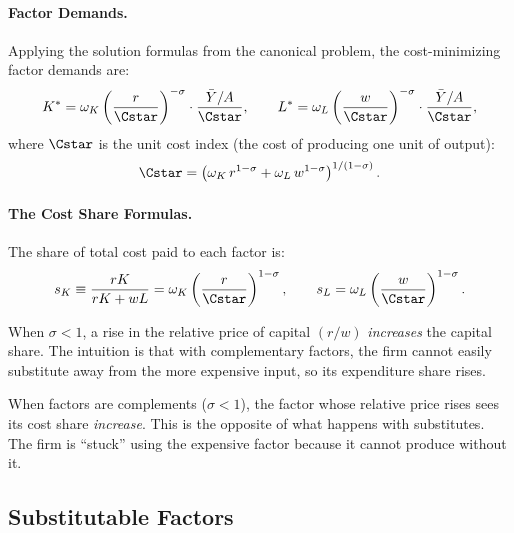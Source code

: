 \paragraph{Factor Demands.}
Applying the solution formulas from the canonical problem, the cost-minimizing factor demands are:
\begin{equation}
K^* = \omega_K \left( \frac{r}{\Cstar} \right)^{-\sigma} \cdot \frac{\bar{Y}/A}{\Cstar}, \qquad L^* = \omega_L \left( \frac{w}{\Cstar} \right)^{-\sigma} \cdot \frac{\bar{Y}/A}{\Cstar},
\label{eq:factor-demands}
\end{equation}
where $\Cstar$ is the unit cost index (the cost of producing one unit of output):
\begin{equation}
\Cstar = \left( \omega_K \, r^{1-\sigma} + \omega_L \, w^{1-\sigma} \right)^{1/(1-\sigma)}.
\label{eq:unit-cost}
\end{equation}

\paragraph{The Cost Share Formulas.}
The share of total cost paid to each factor is:
\begin{equation}
s_K \equiv \frac{rK}{rK + wL} = \omega_K \left( \frac{r}{\Cstar} \right)^{1-\sigma}, \qquad s_L = \omega_L \left( \frac{w}{\Cstar} \right)^{1-\sigma}.
\label{eq:cost-shares}
\end{equation}

When $\sigma < 1$, a rise in the relative price of capital $(r/w)$ \emph{increases} the capital share. The intuition is that with complementary factors, the firm cannot easily substitute away from the more expensive input, so its expenditure share rises.

\begin{calloutimportant}
When factors are complements ($\sigma < 1$), the factor whose relative price rises sees its cost share \emph{increase}. This is the opposite of what happens with substitutes. The firm is ``stuck'' using the expensive factor because it cannot produce without it.
\end{calloutimportant}

\subsection{Substitutable Factors}
\label{subsec:substitutable-factors}


